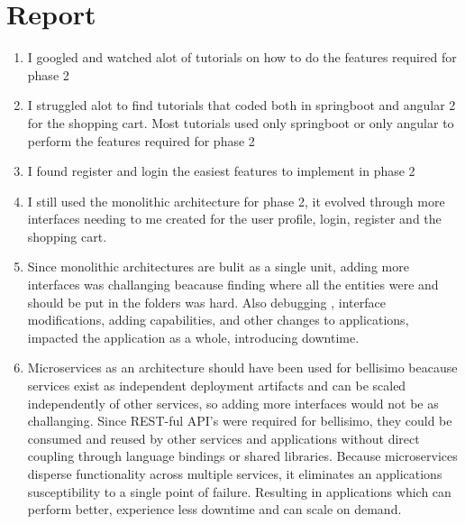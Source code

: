 \documentclass[12pt]{article}
\begin{document}
\section{Report}
\begin{enumerate}
\item  I googled and watched alot of tutorials on how to do the features required for phase 2
\item  I struggled alot to find tutorials that coded both in springboot and angular 2 for the shopping cart. Most tutorials used only springboot or only angular to perform the features required for phase 2
\item I found register and login the easiest features to implement in phase 2
\item I still used the monolithic architecture for phase 2, it evolved through  more interfaces needing to me created for the user profile, login, register and the shopping cart. 
\item Since monolithic architectures are bulit as a single unit, adding more interfaces was challanging beacause finding where all the entities were and should be put in the folders was hard. Also debugging , interface modifications, adding capabilities, and other changes to applications, impacted the application as a whole, introducing downtime. 
\item Microservices as an architecture should have been used for bellisimo beacause services exist as independent deployment artifacts and can be scaled independently of other services, so adding more interfaces would not be as challanging. Since  REST-ful API's were required for bellisimo,  they could  be consumed and reused by other services and applications without direct coupling through language bindings or shared libraries. Because microservices disperse functionality across multiple services, it  eliminates an applications susceptibility to a single point of failure. Resulting in applications which can perform better, experience less downtime and can scale on demand.
\end{enumerate}
\end{document}
